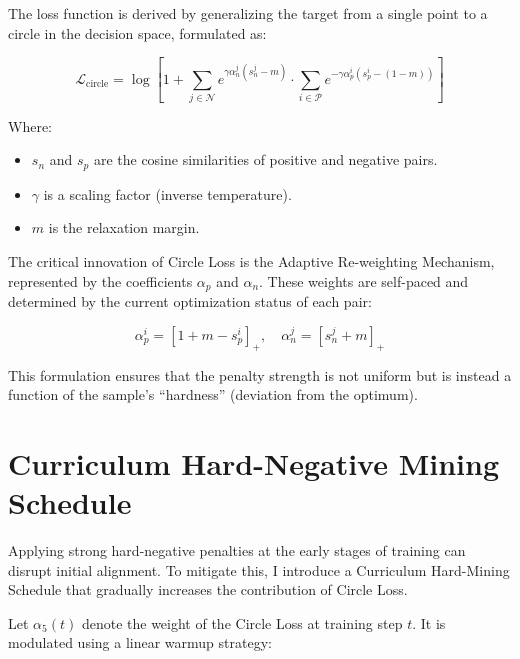 \documentclass[../main.tex]{subfiles}
\begin{document}
\vspace{0.5cm}

\noindent The loss function is derived by generalizing the target from a single point to a circle in the decision space, formulated as:

\begin{equation}
    \mathcal{L}_{\text{circle}} = \log \left[ 1 + \sum_{j \in \mathcal{N}} e^{\gamma \alpha_n^j (s_n^j - m)} \cdot \sum_{i \in \mathcal{P}} e^{-\gamma \alpha_p^i (s_p^i - (1-m))} \right]
\end{equation}

\noindent Where:
\begin{itemize}
    \item $s_n$ and $s_p$ are the cosine similarities of positive and negative pairs.
    \item $\gamma$ is a scaling factor (inverse temperature).
    \item $m$ is the relaxation margin.
\end{itemize}

\vspace{0.5cm}

\noindent The critical innovation of Circle Loss is the Adaptive Re-weighting Mechanism, represented by the coefficients $\alpha_p$ and $\alpha_n$. These weights are self-paced and determined by the current optimization status of each pair:

\begin{equation}
    \alpha_p^i = [1 + m - s_p^i]_+, \quad \alpha_n^j = [s_n^j + m]_+
\end{equation}

\noindent This formulation ensures that the penalty strength is not uniform but is instead a function of the sample's ``hardness'' (deviation from the optimum).



\section{Curriculum Hard-Negative Mining Schedule}

\noindent Applying strong hard-negative penalties at the early stages of training can disrupt initial alignment. To mitigate this, I introduce a Curriculum Hard-Mining Schedule that gradually increases the contribution of Circle Loss.

\vspace{0.5cm}

\noindent Let $\alpha_5(t)$ denote the weight of the Circle Loss at training step $t$. It is modulated using a linear warmup strategy:
\end{document}
